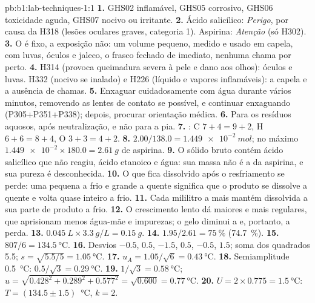 \begin{solution}{pb:b1:lab-techniques-1:1}
\textbf{1.} GHS02 inflamável, GHS05 corrosivo, GHS06 toxicidade aguda,
GHS07 nocivo ou irritante.
\textbf{2.} Ácido salicílico: \emph{Perigo}, por causa da H318 (lesões
oculares graves, categoria 1). Aspirina: \emph{Atenção} (só H302).
\textbf{3.} O  é fixo, a exposição não: um volume pequeno, medido e
usado em capela, com luvas, óculos e jaleco, o frasco fechado de
imediato, nenhuma chama por perto.
\textbf{4.} H314 (provoca queimadura severa à pele e dano aos olhos):
óculos e luvas. H332 (nocivo se inalado) e H226 (líquido e vapores
inflamáveis): a capela e a ausência de chamas.
\textbf{5.} Enxaguar cuidadosamente com água durante vários minutos,
removendo as lentes de contato se possível, e continuar enxaguando
(P305+P351+P338); depois, procurar orientação médica.
\textbf{6.} Para os resíduos aquosos, após neutralização, e não para a
pia.
\textbf{7.} : C $7 + 4 = 9 + 2$,
H $6 + 6 = 8 + 4$, O $3 + 3 = 4 + 2$.
\textbf{8.} $2.00/138.0 = \qty{1.449e-2}{mol}$; no máximo
$\num{1.449e-2} \times 180.0 = \qty{2.61}{g}$ de aspirina.
\textbf{9.} O sólido bruto contém ácido salicílico que não reagiu, ácido
etanoico e água: sua massa não é a da aspirina, e sua pureza é
desconhecida.
\textbf{10.} O que fica dissolvido após o resfriamento se perde: uma
 pequena a frio e grande a quente significa que o produto se
dissolve a quente e volta quase inteiro a frio.
\textbf{11.} Cada mililitro a mais mantém dissolvida a sua parte de
produto a frio.
\textbf{12.} O crescimento lento dá  maiores e mais regulares, que
aprisionam menos água-mãe e impurezas; o gelo diminui a  e,
portanto, a perda.
\textbf{13.} $\qty{0.045}{L} \times \qty{3.3}{g/L} = \qty{0.15}{g}$.
\textbf{14.} $1.95/2.61 = \qty{75}{\percent}$ (\qty{74.7}{\percent}).
\textbf{15.} $807/6 = \qty{134.5}{\celsius}$.
\textbf{16.} Desvios $-0.5$, $0.5$, $-1.5$, $0.5$, $-0.5$, $1.5$; soma
dos quadrados 5.5; $s = \sqrt{5.5/5} = \qty{1.05}{\celsius}$.
\textbf{17.} $u_A = 1.05/\sqrt6 = \qty{0.43}{\celsius}$.
\textbf{18.} Semiamplitude \qty{0.5}{\celsius}: $0.5/\sqrt3 = \qty{0.29}{\celsius}$.
\textbf{19.} $1/\sqrt3 = \qty{0.58}{\celsius}$;
$u = \sqrt{0.428^2 + 0.289^2 + 0.577^2} = \sqrt{0.600} = \qty{0.77}{\celsius}$.
\textbf{20.} $U = 2 \times 0.775 = \qty{1.5}{\celsius}$:
$T = (134.5 \pm 1.5)$~\unit{\celsius}, $k = 2$.

\end{solution}
